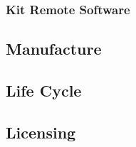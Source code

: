 \begin{draft}
\subsubsection{Kit Remote Software}

\subsection{Manufacture}

\subsection{Life Cycle}

\subsection{Licensing}

\begin{enumerate}


\end{enumerate}
\end{draft}
